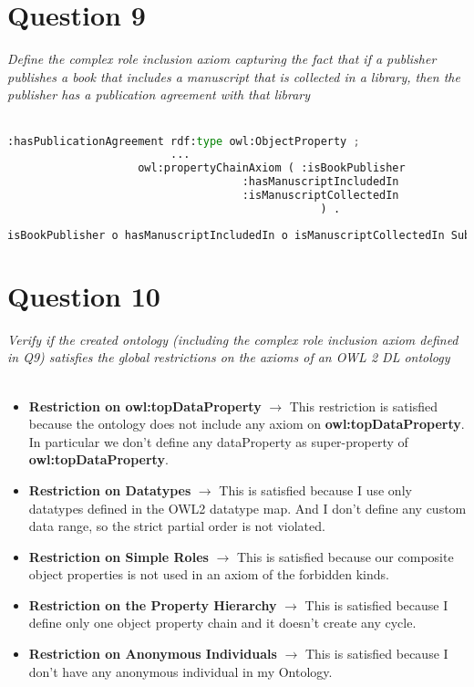 \documentclass[12pt]{report}
\begin{document}
\section*{Question 9}
\textit{Define the complex role inclusion axiom capturing the fact that if a publisher publishes a book that includes a manuscript that is collected in a library, then the publisher has a publication agreement
with that library}\\~\\
\begin{lstlisting}[language=Python, caption=Definition of the complex role inclusion axiom in turtle]
:hasPublicationAgreement rdf:type owl:ObjectProperty ;
                         ...
                    owl:propertyChainAxiom ( :isBookPublisher
                                    :hasManuscriptIncludedIn
                                    :isManuscriptCollectedIn
                                                ) .
\end{lstlisting}

\begin{lstlisting}[language=Python, caption=Definition of the complex role inclusion axiom]
isBookPublisher o hasManuscriptIncludedIn o isManuscriptCollectedIn SubPropertyOf: hasPublicationAgreement
\end{lstlisting}
\section*{Question 10}
\textit{Verify if the created ontology (including the complex role inclusion axiom defined in Q9) satisfies
the global restrictions on the axioms of an OWL 2 DL ontology}\\~\\
\begin{itemize}
    \item \textbf{Restriction on owl:topDataProperty} $\rightarrow$ This restriction is satisfied because the ontology does not include any axiom on \textbf{owl:topDataProperty}. In particular we don't define any dataProperty as super-property of \textbf{owl:topDataProperty}.
    \item \textbf{Restriction on Datatypes} $\rightarrow$ This is satisfied because I use only datatypes defined in the OWL2 datatype map. And I don't define any custom data range, so the strict partial order is not violated.
    \item \textbf{Restriction on Simple Roles} $\rightarrow$ This is satisfied because our composite object properties is not used in an axiom of the forbidden kinds.
    \item \textbf{Restriction on the Property Hierarchy} $\rightarrow$ This is satisfied because I define only one object property chain and it doesn't create any cycle.
    \item \textbf{Restriction on Anonymous Individuals} $\rightarrow$ This is satisfied because I don't have any anonymous individual in my Ontology.
\end{itemize}
\newpage
\end{document}
